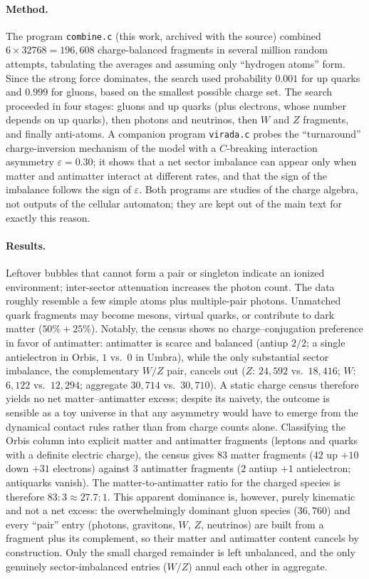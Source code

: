 \documentclass{ijuc}
\begin{document}
\paragraph{Method.} The program \texttt{combine.c} (this work, archived with the source) combined $6\times32768=196{,}608$ charge-balanced fragments in several million random attempts, tabulating the averages and assuming only ``hydrogen atoms'' form.  Since the strong force dominates, the search used probability $0.001$ for up quarks and $0.999$ for gluons, based on the smallest possible charge set.  The search proceeded in four stages: gluons and up quarks (plus electrons, whose number depends on up quarks), then photons and neutrinos, then $W$ and $Z$ fragments, and finally anti-atoms.  A companion program \texttt{virada.c} probes the ``turnaround'' charge-inversion mechanism of the model with a $C$-breaking interaction asymmetry $\varepsilon=0.30$; it shows that a net sector imbalance can appear only when matter and antimatter interact at different rates, and that the sign of the imbalance follows the sign of $\varepsilon$.  Both programs are studies of the charge algebra, not outputs of the cellular automaton; they are kept out of the main text for exactly this reason.
\paragraph{Results.} Leftover bubbles that cannot form a pair or singleton indicate an ionized environment; inter-sector attenuation increases the photon count.  The data roughly resemble a few simple atoms plus multiple-pair photons.  Unmatched quark fragments may become mesons, virtual quarks, or contribute to dark matter ($50\%+25\%$).  Notably, the census shows no charge--conjugation preference in favor of antimatter: antimatter is scarce and balanced (antiup $2/2$; a single antielectron in Orbis, $1$ vs.\ $0$ in Umbra), while the only substantial sector imbalance, the complementary $W/Z$ pair, cancels out ($Z$: $24{,}592$ vs.\ $18{,}416$; $W$: $6{,}122$ vs.\ $12{,}294$; aggregate $30{,}714$ vs.\ $30{,}710$).  A static charge census therefore yields no net matter--antimatter excess; despite its naivety, the outcome is sensible as a toy universe in that any asymmetry would have to emerge from the dynamical contact rules rather than from charge counts alone.
Classifying the Orbis column into explicit matter and antimatter fragments (leptons and quarks with a definite electric charge), the census gives $83$ matter fragments ($42$ up $+10$ down $+31$ electrons) against $3$ antimatter fragments ($2$ antiup $+1$ antielectron; antiquarks vanish).  The matter-to-antimatter ratio for the charged species is therefore $83{:}3\approx27.7{:}1$.  This apparent dominance is, however, purely kinematic and not a net excess: the overwhelmingly dominant gluon species ($36{,}760$) and every ``pair'' entry (photons, gravitons, $W$, $Z$, neutrinos) are built from a fragment plus its complement, so their matter and antimatter content cancels by construction.  Only the small charged remainder is left unbalanced, and the only genuinely sector-imbalanced entries ($W/Z$) annul each other in aggregate.
\end{document}
